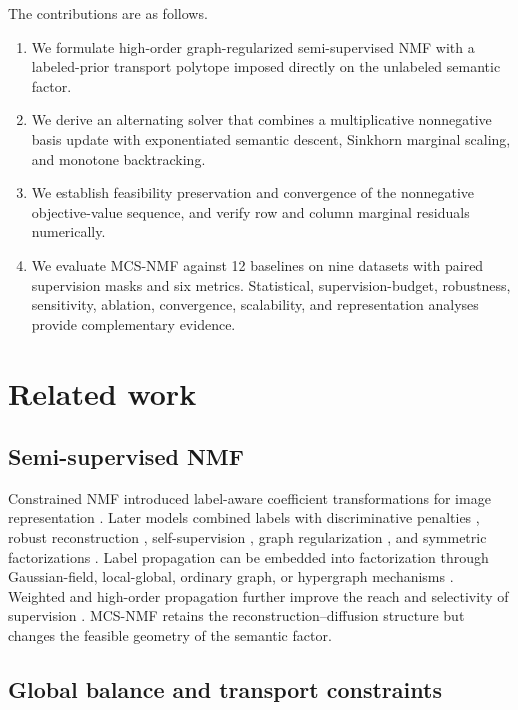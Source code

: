 \documentclass[times, review, 10pt]{elsarticle}
\begin{document}
The contributions are as follows.
\begin{enumerate}[leftmargin=*]
\item We formulate high-order graph-regularized semi-supervised NMF with a labeled-prior transport polytope imposed directly on the unlabeled semantic factor.
\item We derive an alternating solver that combines a multiplicative nonnegative basis update with exponentiated semantic descent, Sinkhorn marginal scaling, and monotone backtracking.
\item We establish feasibility preservation and convergence of the nonnegative objective-value sequence, and verify row and column marginal residuals numerically.
\item We evaluate MCS-NMF against 12 baselines on nine datasets with paired supervision masks and six metrics. Statistical, supervision-budget, robustness, sensitivity, ablation, convergence, scalability, and representation analyses provide complementary evidence.
\end{enumerate}

\section{Related work}

\subsection{Semi-supervised NMF}

Constrained NMF introduced label-aware coefficient transformations for image representation \cite{Liu2012CNMF}. Later models combined labels with discriminative penalties \cite{Xing2021DSSNMF,Li2025EDNMF,Xing2021GNMFLD}, robust reconstruction \cite{Peng2021CSNMF}, self-supervision \cite{Chavoshinejad2023S4NMF}, graph regularization \cite{Cai2011GNMF,Li2025GOCNMF}, and symmetric factorizations \cite{Li2025OCSNMF,Yin2023HSSNMF}. Label propagation can be embedded into factorization through Gaussian-field, local-global, ordinary graph, or hypergraph mechanisms \cite{Zhu2003GaussianFields,Zhou2004LGC,Yi2015LpSNMF,Lan2022LPNMF,Wang2022PNLP}. Weighted and high-order propagation further improve the reach and selectivity of supervision \cite{Jing2026SNMFWLP,Li2026HLPNMF}. MCS-NMF retains the reconstruction--diffusion structure but changes the feasible geometry of the semantic factor.

\subsection{Global balance and transport constraints}
\end{document}
